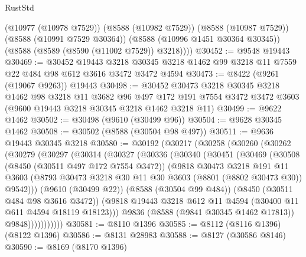 \begin{lexlean}{RustStd}
\begin{coremodule}
        (@10977 (@10978 @7529))
        (@8588 (@10982 @7529))
        (@8588 (@10987 @7529))
        (@8588 (@10991 @7529 @30364))
        (@8588 (@10996 @1451 @30364 @30345))
        (@8588 (@8589 (@8590 (@11002 @7529)) @3218))))
@30452 := @9548 @19443
@30469 := @30452
    @19443
    @3218
    @30345
    @3218
    @1462
    @99
    @3218
    @11
    @7559
    @22
    @484
    @98
    @612
    @3616
    @3472
    @3472
    @4594
@30473 := @8422 (@9261 (@19067 @9263)) @19443
@30498 := @30452
    @30473
    @3218
    @30345
    @3218
    @1462
    @98
    @3218
    @11
    @3682
    @96
    @497
    @172
    @191
    @7554
    @3472
    @3472
    @3603
    (@9600 @19443 @3218 @30345 @3218 @1462 @3218 @11)
@30499 := @9622 @1462
@30502 := @30498 (@9610 (@30499 @96))
@30504 := @9628 @30345 @1462
@30508 := @30502 (@8588 (@30504 @98 @497))
@30511 := @9636 @19443 @30345 @3218
@30580 := @30192
    (@30217
      (@30258
        (@30260
          (@30262
            (@30279
              (@30297
                (@30314
                  (@30327
                    (@30336
                      (@30340
                        (@30451
                          (@30469
                            (@30508
                              (@8450 (@30511 @497 @172 @7554 @3472))
                              (@9818
                                @30473
                                @3218
                                @191
                                @11
                                @3603
                                (@8793
                                  @30473
                                  @3218
                                  @30
                                  @11
                                  @30
                                  @3603
                                  (@8801 (@8802 @30473 @30))
                                  @9542)))
                            (@9610 (@30499 @22))
                            (@8588 (@30504 @99 @484))
                            (@8450 (@30511 @484 @98 @3616 @3472))
                            (@9818
                              @19443
                              @3218
                              @612
                              @11
                              @4594
                              (@30400 @11 @611 @4594 @18119 @18123)))
                          @9836
                          (@8588 (@9841 @30345 @1462 @17813))
                          @9848)))))))))))
@30581 := @8110 @1396
@30585 := @8112 (@8116 @1396) (@8122 @1396)
@30586 := @8131 @28983
@30588 := @8127 (@30586 @8146)
@30590 := @8169 (@8170 @1396)

\end{coremodule}
\end{lexlean}
